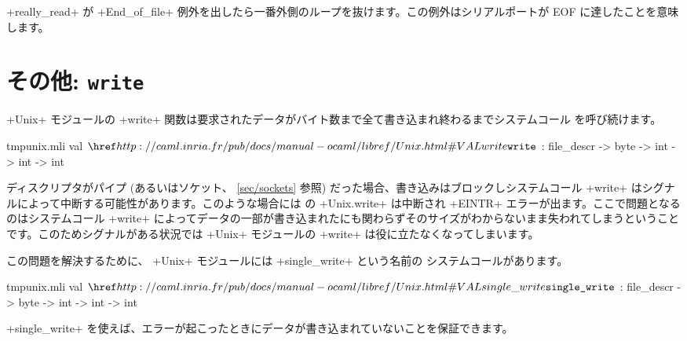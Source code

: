 \begin{example}
\ml+really_read+ が \ml+End_of_file+ 例外を出したら一番外側のループを抜けます。この例外はシリアルポートが EOF に達したことを意味します。
\end{example}

\section{\label{single_write}その他: \texttt{write}}

\ml+Unix+ モジュールの \ml+write+ 関数は要求されたデータがバイト数まで全て書き込まれ終わるまでシステムコール  を呼び続けます。
\begin{listingcodefile}{tmpunix.mli}
val $\libvalue{Unix}{write}$ : file_descr -> byte -> int -> int -> int
\end{listingcodefile}
%
ディスクリプタがパイプ (あるいはソケット、 \ref{sec/sockets} 参照) だった場合、書き込みはブロックしシステムコール \ml+write+ はシグナルによって中断する可能性があります。このような場合には \ocaml の \ml+Unix.write+ は中断され \ml+EINTR+ エラーが出ます。ここで問題となるのはシステムコール \ml+write+ によってデータの一部が書き込まれたにも関わらずそのサイズがわからないまま失われてしまうということです。このためシグナルがある状況では \ml+Unix+ モジュールの \ml+write+ は役に立たなくなってしまいます。

この問題を解決するために、 \ml+Unix+ モジュールには \ml+single_write+ という名前の  システムコールがあります。
\begin{listingcodefile}{tmpunix.mli}
val $\libvalue{Unix}{single\_write}$ : file_descr -> byte -> int -> int -> int
\end{listingcodefile}
\ml+single_write+ を使えば、エラーが起こったときにデータが書き込まれていないことを保証できます。

